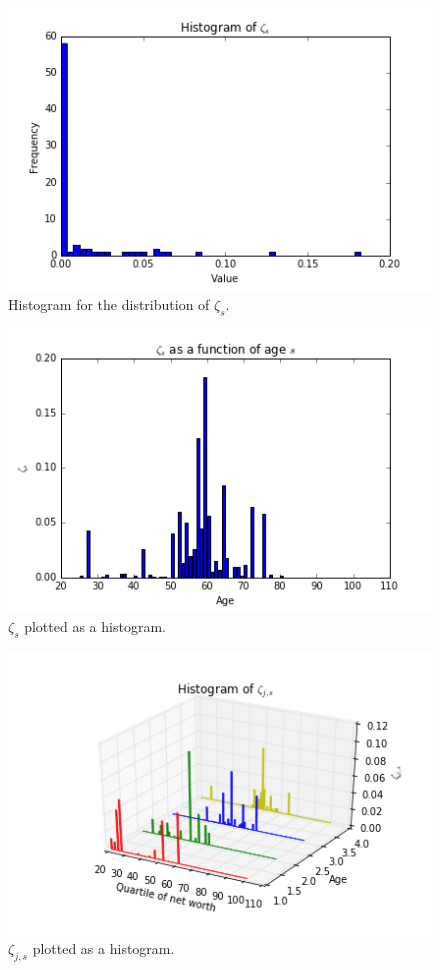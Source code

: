 \documentclass[letterpaper,12pt]{article}
\theoremstyle{definition}
\begin{document}
\begin{figure}[h!]
\centering
\includegraphics[scale=.8]{code/images/zeta_s_hist}
\caption{Histogram for the distribution of $\zeta_s$.}
\end{figure}

\begin{figure}[h!]
\centering
\includegraphics[scale=.8]{code/images/zeta_func}
\caption{$\zeta_s$ plotted as a histogram.}
\end{figure}

\begin{figure}[h!]
\centering
\includegraphics[scale=.8]{code/images/zeta_js_hist}
\caption{$\zeta_{j,s}$ plotted as a histogram.}
\end{figure}
\end{document}
